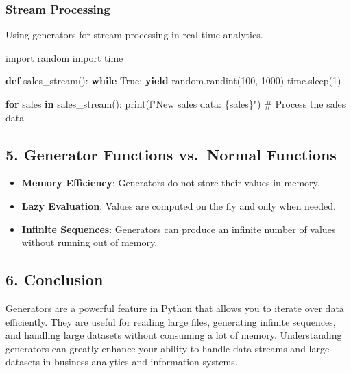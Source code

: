 \documentclass[
  letterpaper,
  DIV=11,
  numbers=noendperiod]{scrreprt}
\newenvironment{Shaded}{\begin{snugshade}}{\end{snugshade}}
\newcommand{\BuiltInTok}[1]{\textcolor[rgb]{0.00,0.23,0.31}{#1}}
\newcommand{\CommentTok}[1]{\textcolor[rgb]{0.37,0.37,0.37}{#1}}
\newcommand{\ControlFlowTok}[1]{\textcolor[rgb]{0.00,0.23,0.31}{\textbf{#1}}}
\newcommand{\DecValTok}[1]{\textcolor[rgb]{0.68,0.00,0.00}{#1}}
\newcommand{\ImportTok}[1]{\textcolor[rgb]{0.00,0.46,0.62}{#1}}
\newcommand{\KeywordTok}[1]{\textcolor[rgb]{0.00,0.23,0.31}{\textbf{#1}}}
\newcommand{\NormalTok}[1]{\textcolor[rgb]{0.00,0.23,0.31}{#1}}
\newcommand{\SpecialCharTok}[1]{\textcolor[rgb]{0.37,0.37,0.37}{#1}}
\newcommand{\SpecialStringTok}[1]{\textcolor[rgb]{0.13,0.47,0.30}{#1}}
\newcommand{\VariableTok}[1]{\textcolor[rgb]{0.07,0.07,0.07}{#1}}
\providecommand{\tightlist}{%
  \setlength{\itemsep}{0pt}\setlength{\parskip}{0pt}}\usepackage{longtable,booktabs,array}
\begin{document}
\subsubsection{Stream Processing}\label{stream-processing}

Using generators for stream processing in real-time analytics.

\begin{Shaded}
\begin{Highlighting}[]
\ImportTok{import}\NormalTok{ random}
\ImportTok{import}\NormalTok{ time}

\KeywordTok{def}\NormalTok{ sales\_stream():}
    \ControlFlowTok{while} \VariableTok{True}\NormalTok{:}
        \ControlFlowTok{yield}\NormalTok{ random.randint(}\DecValTok{100}\NormalTok{, }\DecValTok{1000}\NormalTok{)}
\NormalTok{        time.sleep(}\DecValTok{1}\NormalTok{)}

\ControlFlowTok{for}\NormalTok{ sales }\KeywordTok{in}\NormalTok{ sales\_stream():}
    \BuiltInTok{print}\NormalTok{(}\SpecialStringTok{f"New sales data: }\SpecialCharTok{\{}\NormalTok{sales}\SpecialCharTok{\}}\SpecialStringTok{"}\NormalTok{)}
    \CommentTok{\# Process the sales data}
\end{Highlighting}
\end{Shaded}

\subsection{5. Generator Functions vs.~Normal
Functions}\label{generator-functions-vs.-normal-functions}

\begin{itemize}
\tightlist
\item
  \textbf{Memory Efficiency}: Generators do not store their values in
  memory.
\item
  \textbf{Lazy Evaluation}: Values are computed on the fly and only when
  needed.
\item
  \textbf{Infinite Sequences}: Generators can produce an infinite number
  of values without running out of memory.
\end{itemize}

\subsection{6. Conclusion}\label{conclusion-27}

Generators are a powerful feature in Python that allows you to iterate
over data efficiently. They are useful for reading large files,
generating infinite sequences, and handling large datasets without
consuming a lot of memory. Understanding generators can greatly enhance
your ability to handle data streams and large datasets in business
analytics and information systems.
\end{document}

